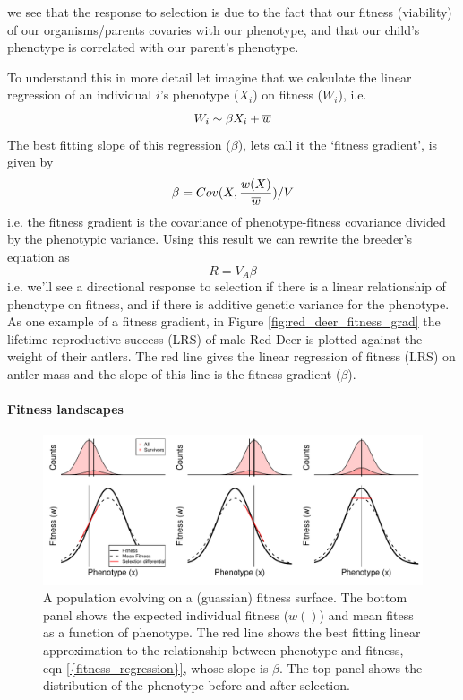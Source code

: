 we see that the response to selection is due to the fact that our
fitness (viability) of our organisms/parents covaries with our phenotype, and
that our child's phenotype is correlated with our parent's phenotype. 

To understand this in more detail let imagine that we calculate the
linear regression of an individual $i$'s phenotype ($X_i$) on fitness ($W_i$), i.e. 
\begin{equation}
W_i \sim \beta X_i + \overline{w} \label{fitness_regression}
\end{equation}  
The best fitting slope of this regression ($\beta$), lets call it the
`fitness gradient', is given by
\begin{equation}
  \beta = Cov(X, \frac{w(X)}{\overline{w}} )/ V  \label{beta_covar}
  \end{equation}
 i.e. the fitness gradient is the covariance of phenotype-fitness
 covariance divided by the phenotypic variance. Using this result we can rewrite the breeder's equation as
\begin{equation}
R= V_A \beta
\end{equation}
i.e. we'll see a directional response to selection if there is a linear relationship of phenotype on fitness, and if there is additive genetic variance for the phenotype. As one example of a fitness gradient, in Figure \ref{fig:red_deer_fitness_grad}  the lifetime reproductive success (LRS) of male Red Deer is plotted against the weight of their antlers. The red line gives the linear regression of fitness (LRS) on antler mass and the slope of this line is the fitness gradient ($\beta$). 

\paragraph{Fitness landscapes}

  \begin{figure}
 \begin{center}
 \includegraphics[width= 0.8 \textwidth]{figures/Response_to_sel/fitness_landscape_1D_w_wbar.pdf}
 \end{center}
 \caption{A population evolving on a (guassian) fitness surface. The
   bottom panel shows the expected individual fitness ($w()$) and mean
   fitess as a function of phenotype. The red line shows the best
   fitting linear approximation to the relationship between phenotype
   and fitness, eqn \eqref{{fitness_regression}}, whose slope is
   $\beta$. The top panel shows the distribution of the phenotype
   before and after selection.} \label{fig:fitness_landscape_1D_w_wbar}  
 \end{figure}

